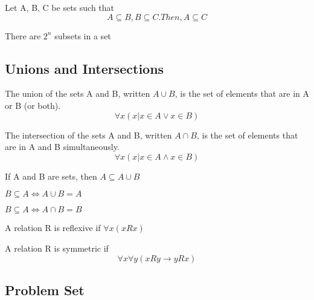 \documentclass{article}
\begin{document}
\begin{theorem}
    Let A, B, C be sets such that $$ A \subseteq B, B \subseteq C. Then, A \subseteq C $$
\end{theorem}

\begin{theorem}
    There are \(2^n\) subsets in a set
\end{theorem}

\subsection{Unions and Intersections}

\begin{definition}[Union]
    The union of the sets A and B, written \(A \cup B\), is the set of elements that
    are in A or B (or both).
    $$ \forall x(x | x \in A \lor x \in B) $$
\end{definition}

\begin{definition}[Intersection]
    The intersection of the sets A and B, written \(A \cap B\), is the set of
    elements that are in A and B simultaneously.
    $$ \forall x(x | x \in A \land x \in B) $$
\end{definition}

\begin{theorem}
    If A and B are sets, then \( A \subseteq A \cup B\)
\end{theorem}

\begin{theorem}
    \(B \subseteq A \iff A \cup B = A\)
\end{theorem}

\begin{theorem}
    \(B \subseteq A \iff A \cap B = B\)
\end{theorem}

\begin{definition}[Reflexive]
    A relation R is reflexive if  $ \forall x(x R x) $
\end{definition}

\begin{definition}[Symmetric]
    A relation R is symmetric if $$\forall x \forall y(x R y \rightarrow y R x)$$
\end{definition}

\subsection{Problem Set}
\end{document}

